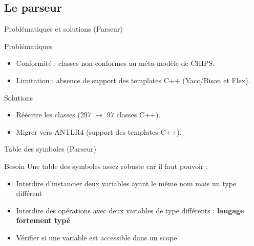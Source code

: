 \subsection{Le parseur}

\begin{frame}{Problématiques et solutions (Parseur)}
    \begin{block}{Problématiques}
        
        \begin{itemize}
            \item Conformité : classes non conformes au méta-modèle de CHIPS.
            \item Limitation : absence de support des templates C++ (Yacc/Bison et Flex).
        \end{itemize}
    \end{block}

{

    \begin{block}{Solutions}
        
        \begin{itemize}
            \item Réécrire les classes (297 $\rightarrow$ 97 classes C++).
            \item Migrer vers ANTLR4 (support des templates C++).
        \end{itemize}
        
    \end{block}
}

    
\end{frame}

\begin{frame}{Table des symboles (Parseur)}
    \begin{block}{Besoin}
        Une table des symboles assez robuste car il faut pouvoir :
        \begin{itemize}
            \item Interdire d'instancier deux variables ayant le même nom mais un type différent
            \item Interdire des opérations avec deux variables de type différents : \textbf{langage fortement typé}
            \item Vérifier si une variable est accessible dans un scope
        \end{itemize}
    \end{block}
\end{frame}

